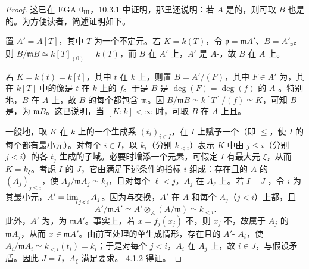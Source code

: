 \begin{proof}
这已在 EGA $0_{\mathrm{III}}$，10.3.1 中证明，那里还说明：若 $A$ 是的，则可取 $B$ 也是的。为方便读者，简述证明如下。

置 $A'=A[T]$，其中 $T$ 为一个不定元。若 $K=k(T)$，令 $\mathfrak p=\mathfrak mA'$、$B=A'_{\mathfrak p}$。则 $B/\mathfrak mB\simeq k[T]_{(0)}=k(T)$，而 $B$ 在 $A'$ 上，$A'$ 是 $A$-，故 $B$ 在 $A$ 上。

若 $K=k(t)=k[t]$，其中 $t$ 在 $k$ 上，则置 $B=A'/(F)$，其中 $F\in A'$ 为，其在 $k[T]$ 中的像是 $t$ 在 $k$ 上的 $f$。于是 $B$ 是 $\deg(F)=\deg(f)$ 的 $A$-。特别地，$B$ 在 $A$ 上，故 $B$ 的每个都包含 $\mathfrak m$。因 $B/\mathfrak mB\simeq k[T]/(f)\simeq K$，可知 $B$ 是，为 $\mathfrak mB$。这已说明，当 $[K:k]<\infty$ 时，可取 $B$ 在 $A$ 上且。

一般地，取 $K$ 在 $k$ 上的一个生成系 $(t_i)_{i\in I}$，在 $I$ 上赋予一个（即 $\leqslant$，使 $I$ 的每个都有最小元）。对每个 $i\in I$，以 $k_i$（分别 $k_{<i}$）表示 $K$ 中由 $j\leqslant i$（分别 $j<i$）的各 $t_j$ 生成的子域。必要时增添一个元素，可假定 $I$ 有最大元 $\xi$，从而 $K=k_\xi$。考虑 $I$ 的 $J$，它由满足下述条件的指标 $i$ 组成：存在且的 $A$-的 $(A_j)_{j\leqslant i}$，使 $A_j/\mathfrak mA_j\simeq k_j$，且对每个 $\ell<j$，$A_j$ 在 $A_\ell$ 上。若 $I-J$ ，令 $i$ 为其最小元，$A'=\varinjlim_{j<i}A_j$。因为与交换，$A'$ 在 $A$ 和每个 $A_j$（$j<i$）上都，且
\[A'/\mathfrak mA'\simeq A'\otimes_A(A/\mathfrak m)\simeq k_{<i}.\]
此外，$A'$ 为，为 $\mathfrak mA'$。事实上，若 $x=f_j(x_j)$ 不，则 $x_j$ 不，故属于 $A_j$ 的 $\mathfrak mA_j$，从而 $x\in\mathfrak mA'$。由前面处理的单生成情形，存在且的 $A'$- $A_i$，使 $A_i/\mathfrak mA_i\simeq k_{<i}(t_i)=k_i$；于是对每个 $j<i$，$A_i$ 在 $A_j$ 上，故 $i\in J$，与假设矛盾。因此 $J=I$，$A_\xi$ 满足要求。 4.1.2 得证。
\end{proof}

